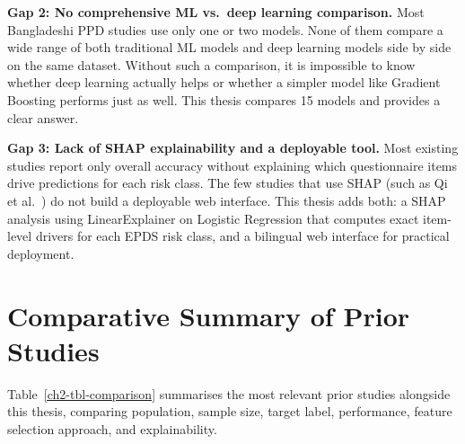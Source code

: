 \textbf{Gap 2: No comprehensive ML vs.\ deep learning comparison.}
Most Bangladeshi PPD studies use only one or two models. None of them compare a wide range of both traditional ML models and deep learning models side by side on the same dataset. Without such a comparison, it is impossible to know whether deep learning actually helps or whether a simpler model like Gradient Boosting performs just as well. This thesis compares 15 models and provides a clear answer.

\textbf{Gap 3: Lack of SHAP explainability and a deployable tool.}
Most existing studies report only overall accuracy without explaining which questionnaire items drive predictions for each risk class. The few studies that use SHAP (such as Qi et al.\ \cite{qi2025prediction}) do not build a deployable web interface. This thesis adds both: a SHAP analysis using LinearExplainer on Logistic Regression that computes exact item-level drivers for each EPDS risk class, and a bilingual web interface for practical deployment.

\section{Comparative Summary of Prior Studies}
\label{ch2-sec-comparison}

Table~\ref{ch2-tbl-comparison} summarises the most relevant prior studies alongside this thesis, comparing population, sample size, target label, performance, feature selection approach, and explainability.

